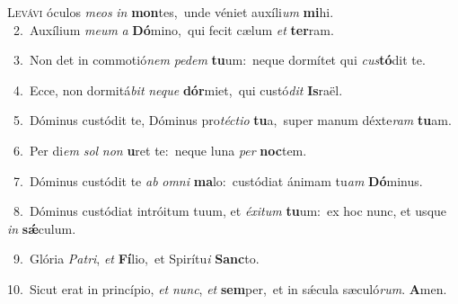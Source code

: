 \lettrine{\initial\textcolor{\initialcolor}{L}}{evávi} óculos \textit{me}\-\textit{os} \textit{in} \textbf{mon}\-tes,~\star unde véniet auxíli\textit{um} \textbf{mi}\-hi.\\
{\numbfont\textcolor{\numbcolor}{~2.}}~Auxílium \textit{me}\-\textit{um} \textit{a} \textbf{Dó}\-mino,~\star qui fecit cælum \textit{et} \textbf{ter}\-ram.\par
{\numbfont\textcolor{\numbcolor}{~3.}}~Non det in commotió\textit{nem} \textit{pe}\-\textit{dem} \textbf{tu}\-um:~\star neque dormítet qui \textit{cus}\-\textbf{tó}dit te.\par
{\numbfont\textcolor{\numbcolor}{~4.}}~Ecce, non dormitá\textit{bit} \textit{ne}\-\textit{que} \textbf{dór}\-miet,~\star qui custó\textit{dit} \textbf{Is}\-raël.\par
{\numbfont\textcolor{\numbcolor}{~5.}}~Dóminus custódit te, Dóminus pro\-\textit{téc}\-\textit{ti}\textit{o} \textbf{tu}\-a,~\star super manum déxte\textit{ram} \textbf{tu}\-am.\par
{\numbfont\textcolor{\numbcolor}{~6.}}~Per di\textit{em} \textit{sol} \textit{non} \textbf{u}\-ret te:~\star neque luna \textit{per} \textbf{noc}\-tem.\par
{\numbfont\textcolor{\numbcolor}{~7.}}~Dóminus custódit te \textit{ab} \textit{om}\-\textit{ni} \textbf{ma}\-lo:~\star custódiat ánimam tu\textit{am} \textbf{Dó}\-minus.\par
{\numbfont\textcolor{\numbcolor}{~8.}}~Dóminus custódiat intróitum tuum, et \textit{éx}\-\textit{i}\textit{tum} \textbf{tu}\-um:~\star ex hoc nunc, et usque \textit{in} \textbf{sǽ}\-culum.\par
{\numbfont\textcolor{\numbcolor}{~9.}}~Glória \textit{Pa}\-\textit{tri}, \textit{et} \textbf{Fí}\-lio,~\star et Spirítu\textit{i} \textbf{Sanc}\-to.\par
{\numbfont\textcolor{\numbcolor}{10.}}~Sicut erat in princípio, \textit{et} \textit{nunc}\-, \textit{et} \textbf{sem}\-per,~\star et in sǽcula sæculó\-\textit{rum}\-. \textbf{A}\-men.\par
